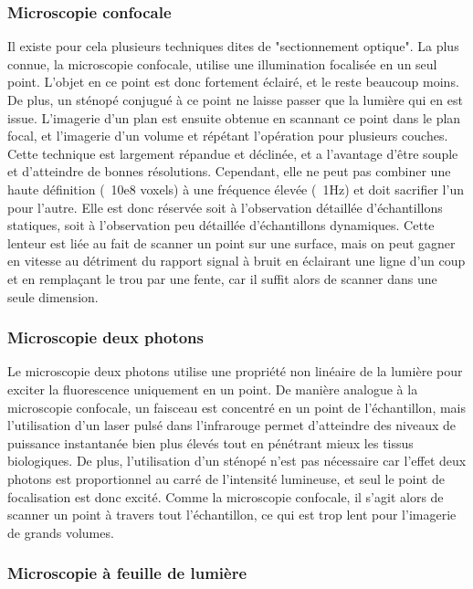 \subsubsection{Microscopie confocale}

Il existe pour cela plusieurs techniques dites de "sectionnement optique". La plus connue, la microscopie confocale, utilise une illumination focalisée en un seul point. L'objet en ce point est donc fortement éclairé, et le reste beaucoup moins. De plus, un sténopé conjugué à ce point ne laisse passer que la lumière qui en est issue. L'imagerie d'un plan est ensuite obtenue en scannant ce point dans le plan focal, et l'imagerie d'un volume et répétant l'opération pour plusieurs couches. Cette technique est largement répandue et déclinée, et a l'avantage d'être souple et d'atteindre de bonnes résolutions. Cependant, elle ne peut pas combiner une haute définition (~10e8 voxels) à une fréquence élevée (~1Hz) et doit sacrifier l'un pour l'autre. Elle est donc réservée soit à l'observation détaillée d'échantillons statiques, soit à l'observation peu détaillée d'échantillons dynamiques. Cette lenteur est liée au fait de scanner un point sur une surface, mais on peut gagner en vitesse au détriment du rapport signal à bruit en éclairant une ligne d'un coup et en remplaçant le trou par une fente, car il suffit alors de scanner dans une seule dimension.

\subsubsection{Microscopie deux photons}

Le microscopie deux photons utilise une propriété non linéaire de la lumière pour exciter la fluorescence uniquement en un point. De manière analogue à la microscopie confocale, un faisceau est concentré en un point de l'échantillon, mais l'utilisation d'un laser pulsé dans l'infrarouge permet d'atteindre des niveaux de puissance instantanée bien plus élevés tout en pénétrant mieux les tissus biologiques. De plus, l'utilisation d'un sténopé n'est pas nécessaire car l'effet deux photons est proportionnel au carré de l'intensité lumineuse, et seul le point de focalisation est donc excité. Comme la microscopie confocale, il s'agit alors de scanner un point à travers tout l'échantillon, ce qui est trop lent pour l'imagerie de grands volumes.  

\subsubsection{Microscopie à feuille de lumière}

